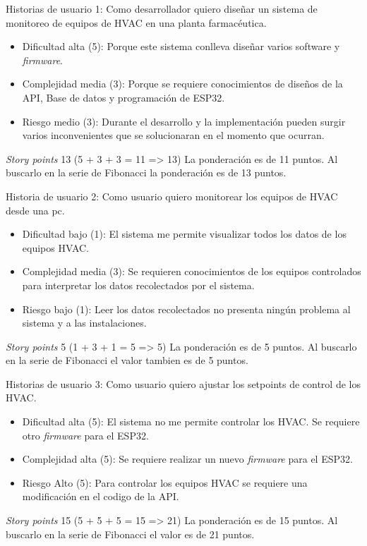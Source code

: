 \documentclass[
11pt, %
codirector, %
]{charter}
\begin{document}
Historias de usuario 1: Como desarrollador quiero diseñar un sistema de monitoreo de equipos de HVAC en una planta farmacéutica.

\begin{itemize}
 \item Dificultad alta (5): Porque este sistema conlleva diseñar varios software y \textit {firmware}.
 \item Complejidad media (3): Porque se requiere conocimientos de diseños de la API, Base de datos y programación de ESP32.
 \item Riesgo medio (3): Durante el desarrollo y la implementación pueden surgir varios inconvenientes que se solucionaran en el momento que ocurran.
\end{itemize}
\textit {Story points} 13  (5 + 3 + 3 = 11 => 13) La ponderación es de 11 puntos. Al buscarlo en la serie de Fibonacci la ponderación es de 13 puntos.

Historia de usuario 2: Como usuario quiero monitorear los equipos de HVAC desde una pc.


\begin{itemize}
 \item Dificultad bajo (1): El sistema me permite visualizar todos los datos de los equipos HVAC.
 \item Complejidad media (3): Se requieren conocimientos de los equipos controlados para interpretar los datos recolectados por el sistema.
 \item Riesgo bajo (1): Leer los datos recolectados no presenta ningún problema al sistema y a las instalaciones.
\end{itemize}

\textit {Story points} 5 (1 + 3 + 1 = 5 => 5) La ponderación es  de 5 puntos. Al buscarlo en la serie de Fibonacci el valor tambien es de 5 puntos.

Historias de usuario 3: Como usuario quiero ajustar los setpoints de control de los HVAC.

\begin{itemize}
 \item Dificultad alta (5): El sistema no me permite controlar los HVAC. Se requiere otro \textit {firmware} para el ESP32. 
 \item Complejidad alta (5): Se requiere realizar un nuevo \textit {firmware}  para el ESP32.
 \item Riesgo Alto (5): Para controlar los equipos HVAC se requiere una modificación en el codigo de la API.
\end{itemize}
\textit {Story points} 15 (5 + 5 + 5 = 15 => 21) La ponderación es  de 15 puntos. Al buscarlo en la serie de Fibonacci el valor es de 21 puntos.
\end{document}
